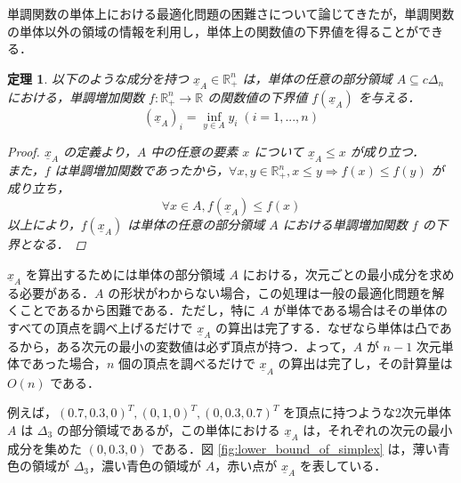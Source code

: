 \documentclass[a4paper,11pt]{jreport}
\newtheorem{theorem}{定理}
\begin{document}
単調関数の単体上における最適化問題の困難さについて論じてきたが，単調関数の単体以外の領域の情報を利用し，単体上の関数値の下界値を得ることができる．

\begin{theorem}\label{thm:lower_bound_of_monotonic_function}
以下のような成分を持つ $ \underline{x}_A \in \mathbb{R}^n_{+} $ は，単体の任意の部分領域 $ A \subseteq c \Delta_n $ における，単調増加関数 $ f :  \mathbb{R}^n_{+} \to \mathbb{R} $ の関数値の下界値 $ f(\underline{x}_A) $ を与える．
$$ (\underline{x}_A)_i = \inf_{y \in A } y_i \; (i = 1, ..., n) $$

\begin{proof}
$ \underline{x}_A $ の定義より，$ A $ 中の任意の要素 $ x $ について $ \underline{x}_A \leq x $ が成り立つ．\\
また，$ f $ は単調増加関数であったから，$ \forall x, y \in \mathbb{R}^n_{+}, x \leq y \Rightarrow f(x) \leq f(y) $ が成り立ち，
$$ \forall x \in A, f(\underline{x}_A) \leq f(x) $$
以上により，$ f(\underline{x}_A) $ は単体の任意の部分領域 $ A $ における単調増加関数 $ f $ の下界となる．
\end{proof}

\end{theorem}

$ \underline{x}_A $ を算出するためには単体の部分領域 $ A $ における，次元ごとの最小成分を求める必要がある．$ A $ の形状がわからない場合，この処理は一般の最適化問題を解くことであるから困難である．ただし，特に $ A $ が単体である場合はその単体のすべての頂点を調べ上げるだけで $ \underline{x}_A $ の算出は完了する．なぜなら単体は凸であるから，ある次元の最小の変数値は必ず頂点が持つ．よって，$ A $ が $ n - 1 $ 次元単体であった場合，$ n $ 個の頂点を調べるだけで $ \underline{x}_A $ の算出は完了し，その計算量は $ O(n) $ である． \par
例えば，$ (0.7, 0.3, 0)^T, (0, 1, 0)^T, (0, 0.3, 0.7)^T $ を頂点に持つような2次元単体 $ A $ は $ \Delta_3 $ の部分領域であるが，この単体における $ \underline{x}_{A} $ は，それぞれの次元の最小成分を集めた $ (0, 0.3, 0) $ である．図 \ref{fig:lower_bound_of_simplex} は，薄い青色の領域が $ \Delta_3 $，濃い青色の領域が $ A $，赤い点が $ \underline{x}_{A} $ を表している．\par
\end{document}
